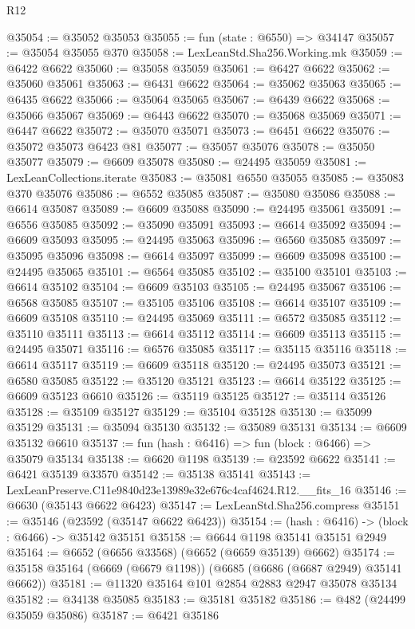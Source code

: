 \begin{lexlean}{R12}
\begin{coremodule}
@35054 := @35052 @35053
@35055 := fun (state : @6550) => @34147
@35057 := @35054 @35055 @370
@35058 := LexLeanStd.Sha256.Working.mk
@35059 := @6422 @6622
@35060 := @35058 @35059
@35061 := @6427 @6622
@35062 := @35060 @35061
@35063 := @6431 @6622
@35064 := @35062 @35063
@35065 := @6435 @6622
@35066 := @35064 @35065
@35067 := @6439 @6622
@35068 := @35066 @35067
@35069 := @6443 @6622
@35070 := @35068 @35069
@35071 := @6447 @6622
@35072 := @35070 @35071
@35073 := @6451 @6622
@35076 := @35072 @35073 @6423 @81
@35077 := @35057 @35076
@35078 := @35050 @35077
@35079 := @6609 @35078
@35080 := @24495 @35059
@35081 := LexLeanCollections.iterate
@35083 := @35081 @6550 @35055
@35085 := @35083 @370 @35076
@35086 := @6552 @35085
@35087 := @35080 @35086
@35088 := @6614 @35087
@35089 := @6609 @35088
@35090 := @24495 @35061
@35091 := @6556 @35085
@35092 := @35090 @35091
@35093 := @6614 @35092
@35094 := @6609 @35093
@35095 := @24495 @35063
@35096 := @6560 @35085
@35097 := @35095 @35096
@35098 := @6614 @35097
@35099 := @6609 @35098
@35100 := @24495 @35065
@35101 := @6564 @35085
@35102 := @35100 @35101
@35103 := @6614 @35102
@35104 := @6609 @35103
@35105 := @24495 @35067
@35106 := @6568 @35085
@35107 := @35105 @35106
@35108 := @6614 @35107
@35109 := @6609 @35108
@35110 := @24495 @35069
@35111 := @6572 @35085
@35112 := @35110 @35111
@35113 := @6614 @35112
@35114 := @6609 @35113
@35115 := @24495 @35071
@35116 := @6576 @35085
@35117 := @35115 @35116
@35118 := @6614 @35117
@35119 := @6609 @35118
@35120 := @24495 @35073
@35121 := @6580 @35085
@35122 := @35120 @35121
@35123 := @6614 @35122
@35125 := @6609 @35123 @6610
@35126 := @35119 @35125
@35127 := @35114 @35126
@35128 := @35109 @35127
@35129 := @35104 @35128
@35130 := @35099 @35129
@35131 := @35094 @35130
@35132 := @35089 @35131
@35134 := @6609 @35132 @6610
@35137 := fun (hash : @6416) => fun (block : @6466) => @35079 @35134
@35138 := @6620 @1198
@35139 := @23592 @6622
@35141 := @6421 @35139 @33570
@35142 := @35138 @35141
@35143 := LexLeanPreserve.C11e9840d23e13989e32e676c4caf4624.R12.__fits_16
@35146 := @6630 (@35143 @6622 @6423)
@35147 := LexLeanStd.Sha256.compress
@35151 := @35146 (@23592 (@35147 @6622 @6423))
@35154 := (hash : @6416) -> (block : @6466) -> @35142 @35151
@35158 := @6644 @1198 @35141 @35151 @2949
@35164 := @6652 (@6656 @33568) (@6652 (@6659 @35139) @6662)
@35174 := @35158 @35164 (@6669 (@6679 @1198)) (@6685 (@6686 (@6687 @2949) @35141 @6662))
@35181 := @11320 @35164 @101 @2854 @2883 @2947 @35078 @35134
@35182 := @34138 @35085
@35183 := @35181 @35182
@35186 := @482 (@24499 @35059 @35086)
@35187 := @6421 @35186

\end{coremodule}
\end{lexlean}
